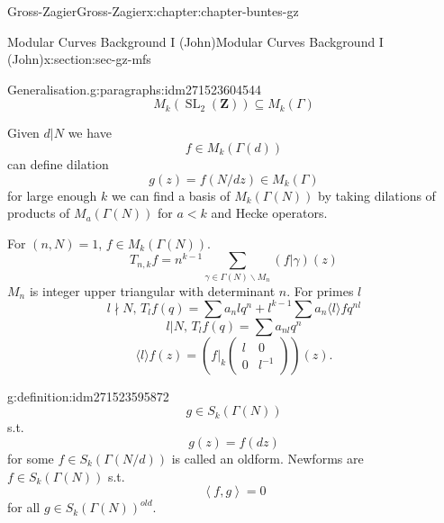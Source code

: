 \documentclass[oneside,10pt,]{book}
\numberwithin{equation}{section}
\newcommand{\inv}{^{-1}}
\newcommand{\pair}[2]{\left\langle #1, #2 \right\rangle}
\newcommand{\ZZ}{\mathbf{Z}}
\DeclareMathOperator{\SL}{SL}
\newcommand{\lt}{<}
\newcommand{\amp}{&}
\begin{document}
\begin{chapterptx}{Gross-Zagier}{}{Gross-Zagier}{}{}{x:chapter:chapter-buntes-gz}
\begin{sectionptx}{Modular Curves Background I (John)}{}{Modular Curves Background I (John)}{}{}{x:section:sec-gz-mfs}
\begin{paragraphs}{Generalisation.}{g:paragraphs:idm271523604544}
\begin{equation*}
\end{equation*}
%
\begin{equation*}
M_k(\SL_2(\ZZ)) \subseteq M_k(\Gamma )
\end{equation*}
%
\par
Given \(d|N\) we have%
\begin{equation*}
f \in M_k(\Gamma (d))
\end{equation*}
can define dilation%
\begin{equation*}
g(z) = f(N/d z) \in M_k(\Gamma )
\end{equation*}
for large enough \(k\) we can find a basis of \(M_k(\Gamma (N))\) by taking dilations of products of \(M_a(\Gamma (N))\) for \(a \lt k\) and Hecke operators.%
\par
For \((n,N) = 1\), \(f\in M_k(\Gamma (N))\).%
\begin{equation*}
T_{n,k} f = n^{k-1} \sum_{\gamma \in \Gamma (N) \backslash M_n} (f|\gamma )(z)
\end{equation*}
\(M_n\) is integer upper triangular with determinant \(n\). For primes \(l\)%
\begin{equation*}
l\nmid N,\, T_l f(q) = \sum a_n l q^n + l^{k-1} \sum a_n \langle l \rangle f q^{nl}
\end{equation*}
%
\begin{equation*}
l | N,\, T_lf(q) = \sum a_{nl} q^n
\end{equation*}
%
\begin{equation*}
\langle l \rangle f(z) = \left(f|_k \begin{pmatrix} l \amp 0 \\ 0 \amp l\inv \end{pmatrix}\right) (z)\text{.}
\end{equation*}
%
\begin{definition}{}{g:definition:idm271523595872}%
%
\begin{equation*}
g \in S_k(\Gamma (N))
\end{equation*}
s.t.%
\begin{equation*}
g(z) = f(d z)
\end{equation*}
for some \(f \in S_k(\Gamma (N/d))\) is called an oldform. Newforms are \(f\in S_k(\Gamma (N))\) s.t.%
\begin{equation*}
\pair fg = 0
\end{equation*}
for all \(g\in S_k(\Gamma (N))^{old}\).%
\end{definition}
\end{paragraphs}%
\end{sectionptx}

\end{chapterptx}
\end{document}
